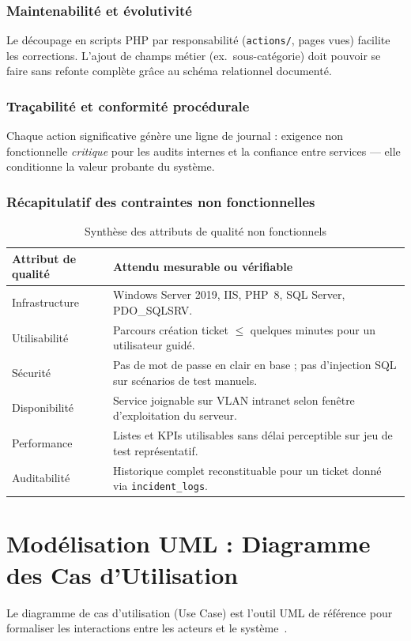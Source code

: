 \subsubsection{Maintenabilité et évolutivité}
Le découpage en scripts PHP par responsabilité (\texttt{actions/}, pages vues) facilite les
corrections. L'ajout de champs métier (ex.\ sous-catégorie) doit pouvoir se faire sans refonte
complète grâce au schéma relationnel documenté.

\subsubsection{Traçabilité et conformité procédurale}
Chaque action significative génère une ligne de journal : exigence non fonctionnelle \emph{critique}
pour les audits internes et la confiance entre services — elle conditionne la valeur probante du
système.

\subsubsection{Récapitulatif des contraintes non fonctionnelles}
\begin{table}[H]
\centering
\small
\begin{tabular}{@{}p{4cm}p{10cm}@{}}
\toprule
\textbf{Attribut de qualité} & \textbf{Attendu mesurable ou vérifiable} \\
\midrule
Infrastructure & Windows Server 2019, IIS, PHP~8, SQL Server, PDO\_SQLSRV. \\
Utilisabilité & Parcours création ticket $\leq$ quelques minutes pour un utilisateur guidé. \\
Sécurité & Pas de mot de passe en clair en base ; pas d'injection SQL sur scénarios de test manuels. \\
Disponibilité & Service joignable sur VLAN intranet selon fenêtre d'exploitation du serveur. \\
Performance & Listes et KPIs utilisables sans délai perceptible sur jeu de test représentatif. \\
Auditabilité & Historique complet reconstituable pour un ticket donné via \texttt{incident\_logs}. \\
\bottomrule
\end{tabular}
\caption{Synthèse des attributs de qualité non fonctionnels}
\label{tab:nfr}
\end{table}

\section{Modélisation UML : Diagramme des Cas d'Utilisation}
Le diagramme de cas d'utilisation (Use Case) est l'outil UML de référence pour
formaliser les interactions entre les acteurs et le système~\cite{roques2006}.

